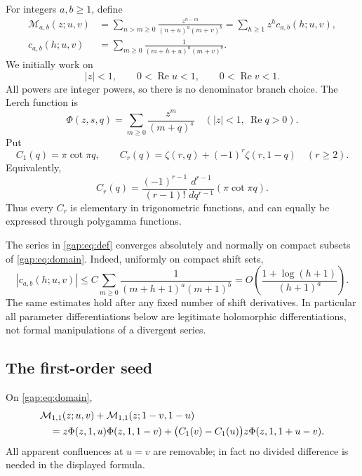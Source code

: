 For integers $a,b\geq1$, define
\begin{equation}\label{gap:eq:def}
 \begin{aligned}
 \mathcal M_{a,b}(z;u,v)
 &=\sum_{n>m\geq0}
   \frac{z^{n-m}}{(n+u)^a(m+v)^b}
 =\sum_{h\geq1}z^h c_{a,b}(h;u,v),\\
 c_{a,b}(h;u,v)&=\sum_{m\geq0}
       \frac1{(m+h+u)^a(m+v)^b}.
 \end{aligned}
\end{equation}
We initially work on
\begin{equation}\label{gap:eq:domain}
 |z|<1,\qquad 0<\operatorname{Re}u<1,
 \qquad 0<\operatorname{Re}v<1.
\end{equation}
All powers are integer powers, so there is no denominator branch
choice. The Lerch function is
\[
 \Phi(z,s,q)=\sum_{m\geq0}\frac{z^m}{(m+q)^s}
 \quad (|z|<1,\ \operatorname{Re}q>0).
\]
Put
\begin{equation}\label{gap:eq:C}
 C_1(q)=\pi\cot\pi q,
 \qquad
 C_r(q)=\zeta(r,q)+(-1)^r\zeta(r,1-q)\quad(r\geq2).
\end{equation}
Equivalently,
\begin{equation}\label{gap:eq:Cderivative}
 C_r(q)=\frac{(-1)^{r-1}}{(r-1)!}
          \frac{d^{r-1}}{dq^{r-1}}(\pi\cot\pi q).
\end{equation}
Thus every $C_r$ is elementary in trigonometric functions, and can
equally be expressed through polygamma functions.

The series in \eqref{gap:eq:def} converges absolutely and normally on
compact subsets of \eqref{gap:eq:domain}. Indeed, uniformly on compact
shift sets,
\[
 |c_{a,b}(h;u,v)|\leq
 C\sum_{m\geq0}\frac1{(m+h+1)^a(m+1)^b}
 =O\left(\frac{1+\log(h+1)}{(h+1)^a}\right).
\]
The same estimates hold after any fixed number of shift derivatives.
In particular all parameter differentiations below are legitimate
holomorphic differentiations, not formal manipulations of a divergent
series.

\subsection{The first-order seed}

\begin{theorem}\label{gap:thm:seed}
On \eqref{gap:eq:domain},
\begin{align}
 &\mathcal M_{1,1}(z;u,v)
   +\mathcal M_{1,1}(z;1-v,1-u)\notag\\
 &\quad=z\Phi(z,1,u)\Phi(z,1,1-v)
   +\bigl(C_1(v)-C_1(u)\bigr)
       z\Phi(z,1,1+u-v).
 \label{gap:eq:seed}
\end{align}
All apparent confluences at $u=v$ are removable; in fact no divided
difference is needed in the displayed formula.
\end{theorem}

